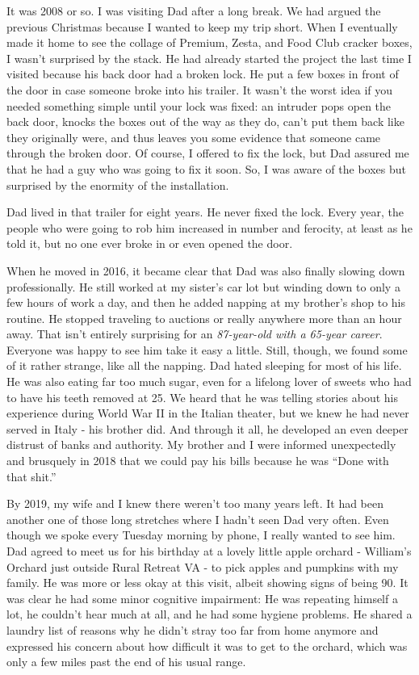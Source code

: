 \documentclass{article}
\begin{document}
It was 2008 or so. I was visiting Dad after a long break. We had argued the previous Christmas because I wanted to keep my trip short. When I eventually made it home to see the collage of Premium, Zesta, and Food Club cracker boxes, I wasn't surprised by the stack. He had already started the project the last time I visited because his back door had a broken lock. He put a few boxes in front of the door in case someone broke into his trailer. It wasn't the worst idea if you needed something simple until your lock was fixed: an intruder pops open the back door, knocks the boxes out of the way as they do, can't put them back like they originally were, and thus leaves you some evidence that someone came through the broken door. Of course, I offered to fix the lock, but Dad assured me that he had a guy who was going to fix it soon. So, I was aware of the boxes but surprised by the enormity of the installation.

Dad lived in that trailer for eight years. He never fixed the lock. Every year, the people who were going to rob him increased in number and ferocity, at least as he told it, but no one ever broke in or even opened the door.

When he moved in 2016, it became clear that Dad was also finally slowing down professionally. He still worked at my sister's car lot but winding down to only a few hours of work a day, and then he added napping at my brother's shop to his routine. He stopped traveling to auctions or really anywhere more than an hour away. That isn't entirely surprising for an \textit{87-year-old with a 65-year career}. Everyone was happy to see him take it easy a little. Still, though, we found some of it rather strange, like all the napping. Dad hated sleeping for most of his life. He was also eating far too much sugar, even for a lifelong lover of sweets who had to have his teeth removed at 25. We heard that he was telling stories about his experience during World War II in the Italian theater, but we knew he had never served in Italy - his brother did. And through it all, he developed an even deeper distrust of banks and authority. My brother and I were informed unexpectedly and brusquely in 2018 that we could pay his bills because he was ``Done with that shit.''

By 2019, my wife and I knew there weren't too many years left. It had been another one of those long stretches where I hadn't seen Dad very often. Even though we spoke every Tuesday morning by phone, I really wanted to see him. Dad agreed to meet us for his birthday at a lovely little apple orchard - William's Orchard just outside Rural Retreat VA - to pick apples and pumpkins with my family. He was more or less okay at this visit, albeit showing signs of being 90. It was clear he had some minor cognitive impairment: He was repeating himself a lot, he couldn't hear much at all, and he had some hygiene problems. He shared a laundry list of reasons why he didn't stray too far from home anymore and expressed his concern about how difficult it was to get to the orchard, which was only a few miles past the end of his usual range.
\end{document}
